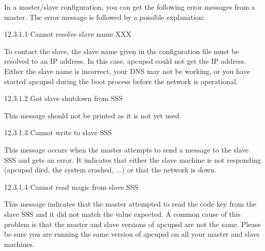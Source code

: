 In a master/slave configuration, you can get the following error messages from
a master. The error message is followed by a possible explanation: 

\label{Cannot-resolve-slave-name-XXX}

{\small12.3.1.1 Cannot resolve slave name XXX}

To contact the slave, the slave name given in the configuration file must be
resolved to an IP address. In this case, apcupsd could not get the IP address.
Either the slave name is incorrect, your DNS may not be working, or you have
started apcupsd during the boot process before the network is operational. 

\label{Got-slave-shutdown-from-SSS}

{\small12.3.1.2 Got slave shutdown from SSS}

This message should not be printed as it is not yet used. 

\label{Cannot-write-to-slave-SSS}

{\small12.3.1.3 Cannot write to slave SSS}

This message occurs when the master attempts to send a message to the slave
SSS and gets an error. It indicates that either the slave machine is not
responding (apcupsd died, the system crashed, ...) or that the network is
down. 

\label{Cannot-read-magic-from-slave-SSS}

{\small12.3.1.4 Cannot read magic from slave SSS}

This message indicates that the master attempted to read the code key from the
slave SSS and it did not match the value expected. A common cause of this
problem is that the master and slave versions of apcupsd are not the same.
Please be sure you are running the same version of apcupsd on all your master
and slave machines. 

\label{Connect-to-slave-SSS-failed}

